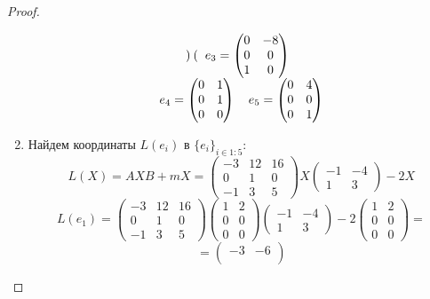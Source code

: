 \documentclass[11pt, fleqn]{article}
\begin{document}
\begin{proof}
\begin{enumerate}
\[\begin{matrix}
\begin{pmatrix}
        \end{pmatrix} \quad
        e_3 =
        \begin{pmatrix}
          0 & -8\\
          0 & 0\\
          1 & 0
        \end{pmatrix}\\
        e_4 =
        \begin{pmatrix}
          0 & 1\\
          0 & 1\\
          0 & 0
        \end{pmatrix} \quad
        e_5 =
        \begin{pmatrix}
          0 & 4\\
          0 & 0\\
          0 & 1
        \end{pmatrix}
      \end{matrix}
      \]
    \item Найдем координаты $L(e_i)$ в $\{e_i\}_{i \in 1:5}$:
    \[L(X) = AXB + mX = \begin{pmatrix}
      -3 & 12 & 16\\
      0 & 1 & 0\\
      -1 & 3 & 5
    \end{pmatrix} X \begin{pmatrix}
      -1 & -4\\
      1 & 3
    \end{pmatrix} -2 X\]
    \[L(e_1) = \begin{pmatrix}
      -3 & 12 & 16\\
      0 & 1 & 0\\
      -1 & 3 & 5
    \end{pmatrix} \begin{pmatrix}
      1 & 2\\
      0 & 0\\
      0 & 0
    \end{pmatrix} \begin{pmatrix}
      -1 & -4\\
      1 & 3
    \end{pmatrix} - 2 \begin{pmatrix}
      1 & 2\\
      0 & 0\\
      0 & 0
    \end{pmatrix} = \]
    \[= \begin{pmatrix}
      -3 & -6 \\

\end{pmatrix}\]
\end{enumerate}
\end{proof}
\end{document}
